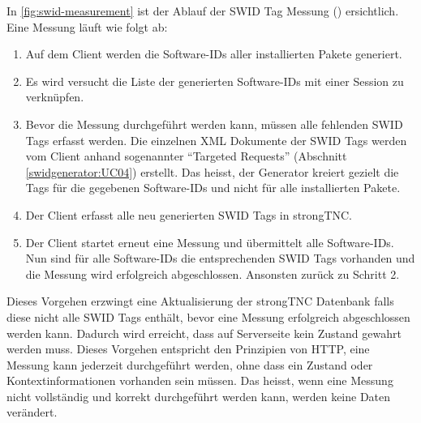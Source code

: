 In \autoref{fig:swid-measurement} ist der Ablauf der SWID Tag Messung
() ersichtlich. Eine Messung läuft wie folgt ab:

\begin{enumerate}
	\item Auf dem Client werden die Software-IDs aller installierten Pakete generiert. 
	
	\item Es wird versucht die Liste der generierten Software-IDs mit einer Session
	zu verknüpfen.
		
	\item Bevor die Messung durchgeführt werden kann, müssen alle fehlenden SWID
	Tags erfasst werden. Die einzelnen XML Dokumente der SWID Tags werden vom
	Client anhand sogenannter \enquote{Targeted Requests} (Abschnitt
	\ref{swidgenerator:UC04}) erstellt. Das heisst, der Generator kreiert gezielt
	die Tags für die gegebenen Software-IDs und nicht für alle installierten
	Pakete.
	
	\item Der Client erfasst alle neu generierten SWID Tags in strongTNC.
	
	\item Der Client startet erneut eine Messung und übermittelt alle Software-IDs.
	Nun sind für alle Software-IDs die entsprechenden SWID Tags vorhanden und die
	Messung wird erfolgreich abgeschlossen. Ansonsten zurück zu Schritt 2.
\end{enumerate}

Dieses Vorgehen erzwingt eine Aktualisierung der strongTNC Datenbank falls diese
nicht alle SWID Tags enthält, bevor eine Messung erfolgreich abgeschlossen
werden kann. Dadurch wird erreicht, dass auf Serverseite kein Zustand gewahrt
werden muss. Dieses Vorgehen entspricht den Prinzipien von
HTTP, eine Messung kann jederzeit durchgeführt werden, ohne dass ein Zustand
oder Kontextinformationen vorhanden sein müssen. Das heisst, wenn eine Messung
nicht vollständig und korrekt durchgeführt werden kann, werden keine Daten
verändert.

